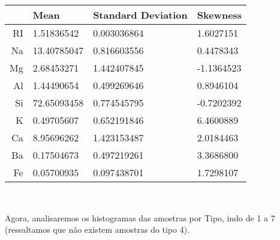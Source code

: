 \documentclass[11pt]{article}
\begin{document}
    \begin{tabular}{r|lll}
  & Mean & Standard Deviation & Skewness\\
\hline
    RI &  1.51836542 & 0.003036864 &  1.6027151 \\
    Na & 13.40785047 & 0.816603556 &  0.4478343 \\
    Mg &  2.68453271 & 1.442407845 & -1.1364523 \\
    Al &  1.44490654 & 0.499269646 &  0.8946104 \\
    Si & 72.65093458 & 0.774545795 & -0.7202392 \\
    K &  0.49705607 & 0.652191846 &  6.4600889 \\
    Ca &  8.95696262 & 1.423153487 &  2.0184463 \\
    Ba &  0.17504673 & 0.497219261 &  3.3686800 \\
    Fe &  0.05700935 & 0.097438701 &  1.7298107 \\
\end{tabular}

    
    \begin{center}
    \end{center}
    { \hspace*{\fill} \\}
    
    Agora, analisaremos os histogramas das amostras por Tipo, indo de 1 a 7
(ressaltamos que não existem amostras do tipo 4).
\end{document}
